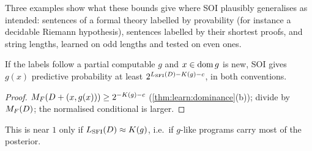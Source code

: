 Three examples show what these bounds give where SOI plausibly generalises as intended: sentences of a formal theory labelled by provability (for instance a decidable Riemann hypothesis), sentences labelled by their shortest proofs, and string lengths, learned on odd lengths and tested on even ones.

\begin{proposition}\label{prop:ood:intended}
If the labels follow a partial computable $g$ and $x\in\operatorname{dom} g$ is new, SOI gives $g(x)$ predictive probability at least $2^{L_{\mathrm{SFI}}(D)-K(g)-c}$, in both conventions.
\end{proposition}

\begin{proof}
$M_{F}(D+(x,g(x)))\ge2^{-K(g)-c}$ (\cref{thm:learn:dominance}(b)); divide by $M_{F}(D)$; the normalised conditional is larger.
\end{proof}

This is near $1$ only if $L_{\mathrm{SFI}}(D)\approx K(g)$, i.e.\ if $g$-like programs carry most of the posterior.

